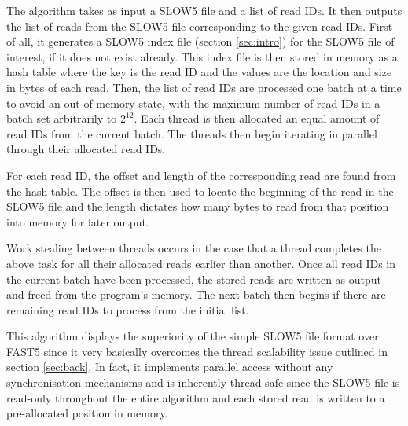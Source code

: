 The algorithm takes as input a SLOW5 file and a list of read IDs. It then outputs the list of reads from the SLOW5 file corresponding to the given read IDs. First of all, it generates a SLOW5 index file (section \ref{sec:intro}) for the SLOW5 file of interest, if it does not exist already. This index file is then stored in memory as a hash table where the key is the read ID and the values are the location and size in bytes of each read. Then, the list of read IDs are processed one batch at a time to avoid an out of memory state, with the maximum number of read IDs in a batch set arbitrarily to $2^{12}$. Each thread is then allocated an equal amount of read IDs from the current batch. The threads then begin iterating in parallel through their allocated read IDs.

For each read ID, the offset and length of the corresponding read are found from the hash table. The offset is then used to locate the beginning of the read in the SLOW5 file and the length dictates how many bytes to read from that position into memory for later output.

Work stealing between threads occurs in the case that a thread completes the above task for all their allocated reads earlier than another. Once all read IDs in the current batch have been processed, the stored reads are written as output and freed from the program's memory. The next batch then begins if there are remaining read IDs to process from the initial list.

This algorithm displays the superiority of the simple SLOW5 file format over FAST5 since it very basically overcomes the thread scalability issue outlined in section \ref{sec:back}. In fact, it implements parallel access without any synchronisation mechanisms and is inherently thread-safe since the SLOW5 file is read-only throughout the entire algorithm and each stored read is written to a pre-allocated position in memory.
